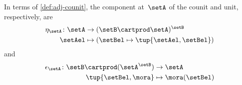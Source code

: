 In terms of \cref{def:adj-counit}, the component at~$\setA$ of the counit and unit, respectively, are
\begin{equation*}
    \begin{aligned}
        \eta_\setA \colon \setA &\to  (\setB \cartprod \setA)^\setB\\
        \setAel &\mapsto (\setBel \mapsto \tup{\setAel,\setBel})
    \end{aligned}
\end{equation*}
and
\begin{equation*}
    \begin{aligned}
        \epsilon_\setA \colon \setB \cartprod (\setA^\setB) &\to \setA\\
        \tup{\setBel,\mora} &\mapsto \mora(\setBel)
    \end{aligned}
\end{equation*}
